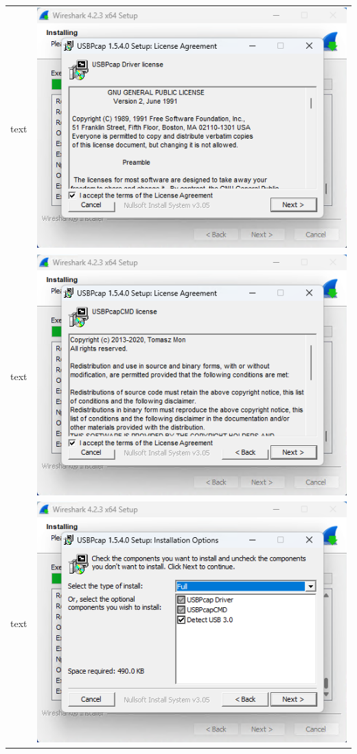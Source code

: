 \documentclass[11pt]{report}
\begin{document}
\begin{tabular}{ l r }
            text & \includegraphics[scale=1.0]{wireshark15} \\
            text & \includegraphics[scale=1.0]{wireshark16} \\
            text & \includegraphics[scale=1.0]{wireshark17} \\

\end{tabular}
\end{document}
